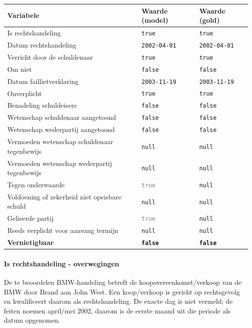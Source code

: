 \documentclass[
  dutch,
  a4paper,
]{article}
\begin{document}
\begin{center}
\small
\begin{tabular}{@{}p{7.4cm}p{2.6cm}p{2.6cm}@{}}
\toprule
Variabele & Waarde (model) & Waarde (gold) \\
\midrule
Is rechtshandeling & \texttt{true} & \texttt{true} \\
Datum rechtshandeling & \texttt{2002-04-01} & \texttt{2002-04-01} \\
Verricht door de schuldenaar & \texttt{true} & \texttt{true} \\
Om niet & \texttt{false} & \texttt{false} \\
Datum faillietverklaring & \texttt{2003-11-19} & \texttt{2003-11-19} \\
Onverplicht & \texttt{true} & \texttt{true} \\
Benadeling schuldeisers & \texttt{false} & \texttt{false} \\
Wetenschap schuldenaar aangetoond & \texttt{false} & \texttt{false} \\
Wetenschap wederpartij aangetoond & \texttt{false} & \texttt{false} \\
Vermoeden wetenschap schuldenaar tegenbewijs & \texttt{null} & \texttt{null} \\
Vermoeden wetenschap wederpartij tegenbewijs & \texttt{null} & \texttt{null} \\
Tegen onderwaarde & \textcolor{gray}{\texttt{true}} & \texttt{null} \\
Voldoening of zekerheid niet opeisbare schuld & \texttt{null} & \texttt{null} \\
Gelieerde partij & \textcolor{gray}{\texttt{true}} & \texttt{null} \\
Reeds verplicht voor aanvang termijn & \texttt{null} & \texttt{null} \\
\textbf{Vernietigbaar} & \textbf{\texttt{false}} & \textbf{\texttt{false}} \\
\bottomrule
\end{tabular}
\end{center}

\paragraph{Is rechtshandeling - overwegingen}\label{is-rechtshandeling---overwegingen-58}

De te beoordelen BMW-handeling betreft de koopovereenkomst/verkoop van de BMW door Brand aan John West. Een koop/verkoop is gericht op rechtsgevolg en kwalificeert daarom als rechtshandeling. De exacte dag is niet vermeld; de feiten noemen april/mei 2002, daarom is de eerste maand uit die periode als datum opgenomen.
\end{document}
